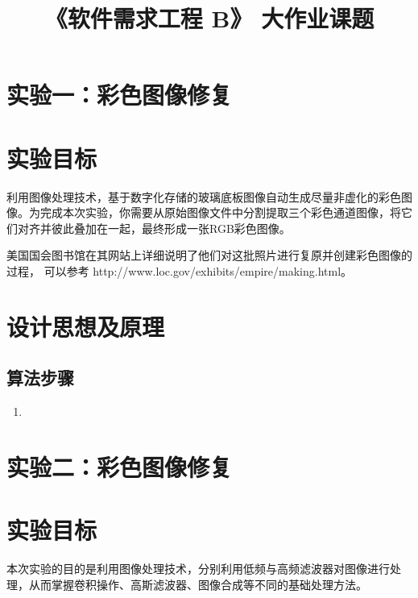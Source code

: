 \documentclass[withoutpreface,bwprint]{cumcmthesis} %
\title{《软件需求工程 B》 大作业课题}
\begin{document}
 
%  

\newpage

\section*{\LARGE 实验一：彩色图像修复}

\section{实验目标}
利用图像处理技术，基于数字化存储的玻璃底板图像自动生成尽量非虚化的彩色图像。为完成本次实验，你需要从原始图像文件中分割提取三个彩色通道图像，将它们对齐并彼此叠加在一起，最终形成一张RGB彩色图像。

美国国会图书馆在其网站上详细说明了他们对这批照片进行复原并创建彩色图像的过程，
可以参考 http://www.loc.gov/exhibits/empire/making.html。

\section{设计思想及原理}


\subsection{算法步骤}
\begin{enumerate}[itemindent=2em]  %
    \item 
\end{enumerate}


\newpage

\section*{\LARGE 实验二：彩色图像修复}
\section{实验目标}
本次实验的目的是利用图像处理技术，分别利用低频与高频滤波器对图像进行处理，从而掌握卷积操作、高斯滤波器、图像合成等不同的基础处理方法。
\end{document}
